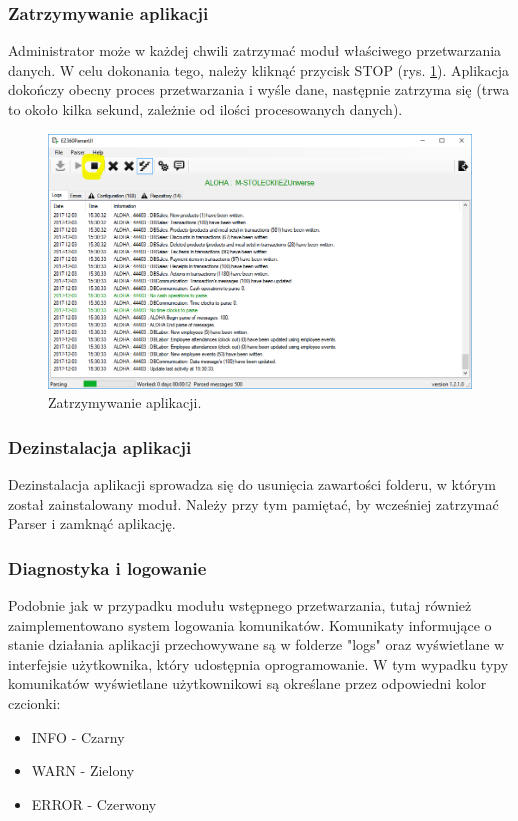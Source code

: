 \documentclass[a4paper]{book}
\begin{document}
\subsubsection{Zatrzymywanie aplikacji}
Administrator może w każdej chwili zatrzymać moduł właściwego przetwarzania danych. W celu dokonania tego, należy kliknąć przycisk STOP (rys. \ref{fig:zatrzymywanie_aplikacji}). Aplikacja dokończy obecny proces przetwarzania i wyśle dane, następnie zatrzyma się (trwa to około kilka sekund, zależnie od ilości procesowanych danych).
\begin{figure}[h]
	\centering
	\includegraphics[width=\textwidth]{./img/zatrzymywanie_aplikacji.png}
	\caption{Zatrzymywanie aplikacji.}
	\label{fig:zatrzymywanie_aplikacji}
\end{figure}
\subsubsection{Dezinstalacja aplikacji}
Dezinstalacja aplikacji sprowadza się do usunięcia zawartości folderu, w którym został zainstalowany moduł. Należy przy tym pamiętać, by wcześniej zatrzymać Parser i zamknąć aplikację.
\subsubsection{Diagnostyka i logowanie}
Podobnie jak w przypadku modułu wstępnego przetwarzania, tutaj również zaimplementowano system logowania komunikatów. Komunikaty informujące o stanie działania aplikacji przechowywane są w folderze "logs" oraz wyświetlane w interfejsie użytkownika, który udostępnia oprogramowanie. W tym wypadku typy komunikatów wyświetlane użytkownikowi są określane przez odpowiedni kolor czcionki:
 \begin{itemize}
 	\item INFO - Czarny
 	\item WARN - Zielony
 	\item ERROR - Czerwony
 \end{itemize}
\end{document}
